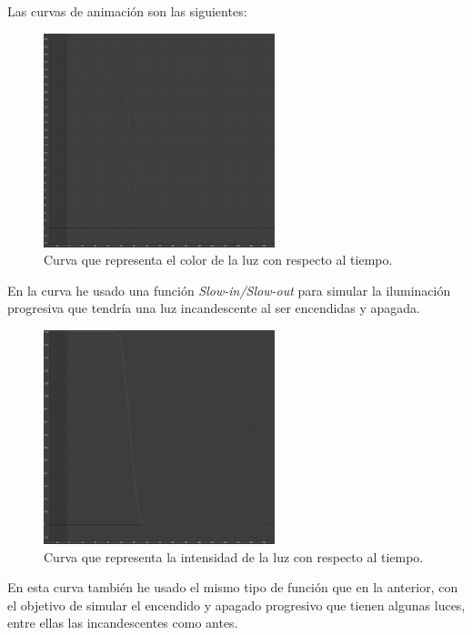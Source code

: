 \newpage

Las curvas de animación son las siguientes:

\begin{figure}[H]
   \centering
   \includegraphics[width=0.6\textwidth]{imagenes/curvas/LL/filter.png}
   \caption{Curva que representa el color de la luz con respecto al tiempo.}
\end{figure}

En la curva he usado una función \textit{Slow-in/Slow-out} para simular la iluminación progresiva que tendría una luz incandescente al ser encendidas y apagada.

\begin{figure}[H]
   \centering
   \includegraphics[width=0.6\textwidth]{imagenes/curvas/LL/intensity.png}
   \caption{Curva que representa la intensidad de la luz con respecto al tiempo.}
\end{figure}

En esta curva también he usado el mismo tipo de función que en la anterior, con el objetivo de simular el encendido y apagado progresivo que tienen algunas luces, entre ellas las incandescentes como antes.


